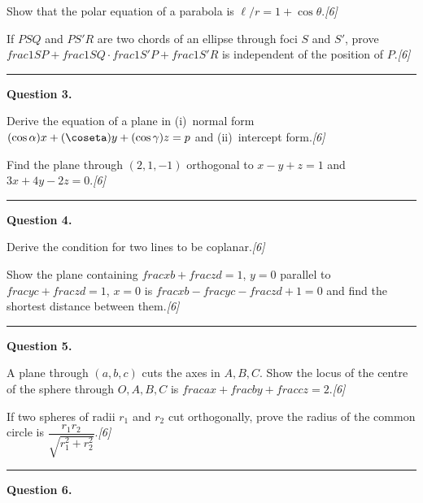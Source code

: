 \documentclass[11pt,a4paper]{article}
\newcommand{\pts}[1]{\hfill   \textit{[#1]}}
\begin{document}
\begin{parts}
  \item Show that the polar equation of a parabola is $\ell/r=1+\cos \theta$.\pts{6}
  \item If $PSQ$ and $PS'R$ are two chords of an ellipse through foci $S$ and $S'$, prove $ frac{1}{SP}+ frac{1}{SQ}\cdot frac{1}{S'P}+ frac{1}{S'R}$ is independent of the position of $P$.\pts{6}
\end{parts}
\medskip\rule{\linewidth}{0.2pt}

\medskip


\noindent   \textbf{Question 3.}

\begin{parts}
  \item Derive the equation of a plane in (i)~normal form $(\cos\alpha)x+(\coseta)y+(\cos\gamma)z=p$ and (ii)~intercept form.\pts{6}
  \item Find the plane through $(2,1,-1)$ orthogonal to $x-y+z=1$ and $3x+4y-2z=0$.\pts{6}
\end{parts}
\medskip\rule{\linewidth}{0.2pt}

\medskip


\noindent   \textbf{Question 4.}

\begin{parts}
  \item Derive the condition for two lines to be coplanar.\pts{6}
  \item Show the plane containing $ frac{x}{b}+ frac{z}{d}=1$, $y=0$ parallel to $ frac{y}{c}+ frac{z}{d}=1$, $x=0$ is $ frac{x}{b}- frac{y}{c}- frac{z}{d}+1=0$ and find the shortest distance between them.\pts{6}
\end{parts}
\medskip\rule{\linewidth}{0.2pt}

\medskip


\noindent   \textbf{Question 5.}

\begin{parts}
  \item A plane through $(a,b,c)$ cuts the axes in $A,B,C$. Show the locus of the centre of the sphere through $O,A,B,C$ is $ frac{a}{x}+ frac{b}{y}+ frac{c}{z}=2$.\pts{6}
  \item If two spheres of radii $r_1$ and $r_2$ cut orthogonally, prove the radius of the common circle is $\dfrac{r_1 r_2}{\sqrt{r_1^2+r_2^2}}$.\pts{6}
\end{parts}
\medskip\rule{\linewidth}{0.2pt}

\medskip


\noindent   \textbf{Question 6.}
\end{document}
